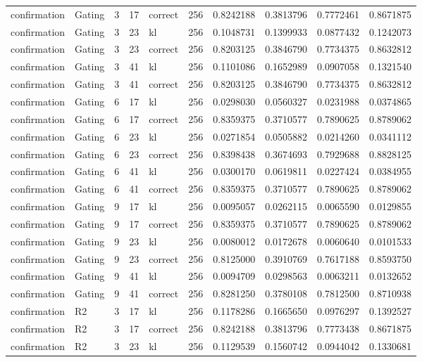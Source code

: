 \begin{tabular}{llrrlrrrrr}
confirmation & Gating & 3 & 17 & correct & 256 & 0.8242188 & 0.3813796 & 0.7772461 & 0.8671875 \\
confirmation & Gating & 3 & 23 & kl & 256 & 0.1048731 & 0.1399933 & 0.0877432 & 0.1242073 \\
confirmation & Gating & 3 & 23 & correct & 256 & 0.8203125 & 0.3846790 & 0.7734375 & 0.8632812 \\
confirmation & Gating & 3 & 41 & kl & 256 & 0.1101086 & 0.1652989 & 0.0907058 & 0.1321540 \\
confirmation & Gating & 3 & 41 & correct & 256 & 0.8203125 & 0.3846790 & 0.7734375 & 0.8632812 \\
confirmation & Gating & 6 & 17 & kl & 256 & 0.0298030 & 0.0560327 & 0.0231988 & 0.0374865 \\
confirmation & Gating & 6 & 17 & correct & 256 & 0.8359375 & 0.3710577 & 0.7890625 & 0.8789062 \\
confirmation & Gating & 6 & 23 & kl & 256 & 0.0271854 & 0.0505882 & 0.0214260 & 0.0341112 \\
confirmation & Gating & 6 & 23 & correct & 256 & 0.8398438 & 0.3674693 & 0.7929688 & 0.8828125 \\
confirmation & Gating & 6 & 41 & kl & 256 & 0.0300170 & 0.0619811 & 0.0227424 & 0.0384955 \\
confirmation & Gating & 6 & 41 & correct & 256 & 0.8359375 & 0.3710577 & 0.7890625 & 0.8789062 \\
confirmation & Gating & 9 & 17 & kl & 256 & 0.0095057 & 0.0262115 & 0.0065590 & 0.0129855 \\
confirmation & Gating & 9 & 17 & correct & 256 & 0.8359375 & 0.3710577 & 0.7890625 & 0.8789062 \\
confirmation & Gating & 9 & 23 & kl & 256 & 0.0080012 & 0.0172678 & 0.0060640 & 0.0101533 \\
confirmation & Gating & 9 & 23 & correct & 256 & 0.8125000 & 0.3910769 & 0.7617188 & 0.8593750 \\
confirmation & Gating & 9 & 41 & kl & 256 & 0.0094709 & 0.0298563 & 0.0063211 & 0.0132652 \\
confirmation & Gating & 9 & 41 & correct & 256 & 0.8281250 & 0.3780108 & 0.7812500 & 0.8710938 \\
confirmation & R2 & 3 & 17 & kl & 256 & 0.1178286 & 0.1665650 & 0.0976297 & 0.1392527 \\
confirmation & R2 & 3 & 17 & correct & 256 & 0.8242188 & 0.3813796 & 0.7773438 & 0.8671875 \\
confirmation & R2 & 3 & 23 & kl & 256 & 0.1129539 & 0.1560742 & 0.0944042 & 0.1330681 \\

\end{tabular}
